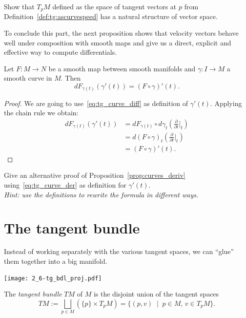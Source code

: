 \begin{exercise}
  Show that $T_p M$ defined as the space of tangent vectors at $p$ from Definition~\ref{def:tg:ascurvespeed} has a natural structure of vector space.
\end{exercise}

To conclude this part, the next proposition shows that velocity vectors behave well under composition with smooth maps and give us a direct, explicit and effective way to compute differentials.

\begin{proposition}\label{prop:curves_deriv}
  Let $F:M\to N$ be a smooth map between smooth manifolds and $\gamma:I\to M$ a smooth curve in $M$.
  Then
  \begin{equation}
    d F_{\gamma(t)} (\gamma'(t)) = (F\circ\gamma)'(t).
  \end{equation}
\end{proposition}
\begin{proof}
  We are going to use~\eqref{eq:tg_curve_diff} as definition of $\gamma'(t)$.
  Applying the chain rule we obtain:
  \begin{align}
    d F_{\gamma(t)} (\gamma'(t))
     & = d F_{\gamma(t)} \circ d\gamma_t\left(\frac{\partial}{\partial t}\Big|_t\right) \\
     & = d (F\circ\gamma)_t \left(\frac{\partial}{\partial t}\Big|_t\right)             \\
     & = (F\circ\gamma)'(t).
  \end{align}
\end{proof}

\begin{exercise}
  Give an alternative proof of Proposition~\ref{prop:curves_deriv} using~\eqref{eq:tg_curve_der} as definition for $\gamma'(t)$.\\
  \textit{\small Hint: use the definitions to rewrite the formula in different ways.}
\end{exercise}

\section{The tangent bundle}\label{sec:tangentbundle}

Instead of working separately with the various tangent spaces, we can ``glue'' them together into a big manifold.

\begin{marginfigure}
  \texttt{[image: 2\_6-tg\_bdl\_proj.pdf]}
\end{marginfigure}
\begin{definition}
  The \emph{tangent bundle} $TM$ of $M$ is the disjoint union of the tangent spaces
  \begin{equation}
    TM := \bigsqcup_{p\in M}\left(\{p\}\times T_pM\right)
    = \{(p,v) \;\mid\; p\in M,\, v\in T_pM\}.
  \end{equation}
\end{definition}

